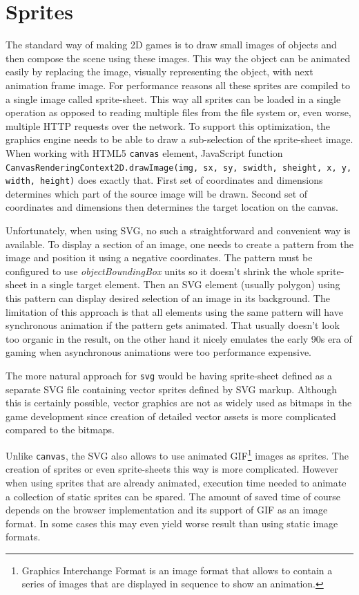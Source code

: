 \documentclass[11pt,oneside, final]{fithesis2}
\begin{document}
\section{Sprites}
The standard way of making 2D games is to draw small images of objects and then compose the scene using these images. This way the object can be animated easily by replacing the image, visually representing the object, with next animation frame image. For performance reasons all these sprites are compiled to a single image called sprite-sheet. This way all sprites can be loaded in a single operation as opposed to reading multiple files from the file system or, even worse, multiple HTTP requests over the network.\cite{pagella} To support this optimization, the graphics engine needs to be able to draw a sub-selection of the sprite-sheet image. When working with HTML5 \texttt{canvas} element, JavaScript function \texttt{CanvasRenderingContext2D.drawImage(img, sx, sy, swidth, sheight, x, y, width, height)} does exactly that\cite{canvasdrawimage}. First set of coordinates and dimensions determines which part of the source image will be drawn. Second set of coordinates and dimensions then determines the target location on the canvas.

Unfortunately, when using SVG, no such a straightforward and convenient way is available. To display a section of an image, one needs to create a pattern from the image and position it using a negative coordinates. The pattern must be configured to use \emph{objectBoundingBox} units so it doesn't shrink the whole sprite-sheet in a single target element. Then an SVG element (usually polygon) using this pattern can display desired selection of an image in its background. The limitation of this approach is that all elements using the same pattern will have synchronous animation if the pattern gets animated. That usually doesn't look too organic in the result, on the other hand it nicely emulates the early 90s era of gaming when asynchronous animations were too performance expensive.

The more natural approach for \texttt{svg} would be having sprite-sheet defined as a separate SVG file containing vector sprites defined by SVG markup. Although this is certainly possible, vector graphics are not as widely used as bitmaps in the game development since creation of detailed vector assets is more complicated compared to the bitmaps.

Unlike \texttt{canvas}, the SVG also allows to use animated GIF\footnote{Graphics Interchange Format is an image format that allows to contain a series of images that are displayed in sequence to show an animation\cite{gifstandard}.} images as sprites. The creation of sprites or even sprite-sheets this way is more complicated. However when using sprites that are already animated, execution time needed to animate a collection of static sprites can be spared. The amount of saved time of course depends on the browser implementation and its support of GIF as an image format. In some cases this may even yield worse result than using static image formats.
\end{document}
